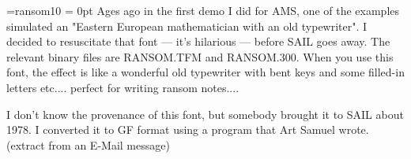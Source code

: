 \font\ran=ransom10
\hsize 6in
\overfullrule = 0pt
\ran
Ages ago in the first demo I did for AMS, one of the examples
simulated an "Eastern European mathematician with an old typewriter".
I decided to resuscitate that font --- it's hilarious --- before SAIL
goes away. The relevant binary files are RANSOM.TFM and RANSOM.300.
When you use this font, the effect is like a wonderful old typewriter
with bent keys and some filled-in letters etc....  perfect for writing
ransom notes....

I don't know the provenance of this font, but somebody brought it to
SAIL about 1978. I converted it to GF format using a program that
Art Samuel wrote. 
(extract from an E-Mail message)

\bye